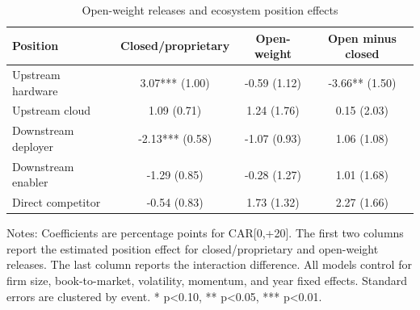 \begin{table}[!htbp]
\centering
\small
\caption{Open-weight releases and ecosystem position effects}
\label{tab:open_closed_position_effects}
\begin{tabular}{lccc}
\toprule
Position & Closed/proprietary & Open-weight & Open minus closed \\
\midrule
Upstream hardware & 3.07*** (1.00) & -0.59 (1.12) & -3.66** (1.50)
\\
Upstream cloud & 1.09 (0.71) & 1.24 (1.76) & 0.15 (2.03)
\\
Downstream deployer & -2.13*** (0.58) & -1.07 (0.93) & 1.06 (1.08)
\\
Downstream enabler & -1.29 (0.85) & -0.28 (1.27) & 1.01 (1.68)
\\
Direct competitor & -0.54 (0.83) & 1.73 (1.32) & 2.27 (1.66)
\\
\bottomrule
\end{tabular}
\begin{minipage}{0.94\linewidth}\vspace{0.4em}\footnotesize Notes: Coefficients are percentage points for CAR[0,+20]. The first two columns report the estimated position effect for closed/proprietary and open-weight releases. The last column reports the interaction difference. All models control for firm size, book-to-market, volatility, momentum, and year fixed effects. Standard errors are clustered by event. * p<0.10, ** p<0.05, *** p<0.01.\end{minipage}
\end{table}
